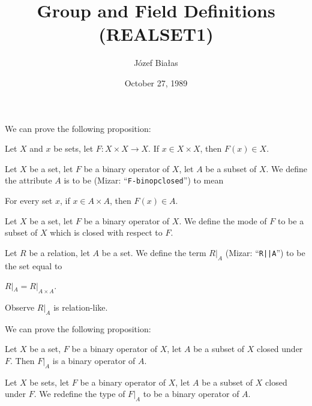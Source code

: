 \documentclass{article}
\title{Group and Field Definitions (REALSET1)}
\author{J\'ozef Bia{\l}as}
\date{October 27, 1989}
\begin{document}
\maketitle

We can prove the following proposition:
\begin{thm}
\item\label{realset1:1} Let $X$ and $x$ be sets, let $F\colon X\times X\to X$.
  If $x\in X\times X$, then $F(x)\in X$.
\end{thm}

\begin{definition}
Let $X$ be a set, let $F$ be a binary operator of $X$, let $A$ be a
subset of $X$.
We define the attribute $A$ is to be 
(Mizar: ``\verb#F-binopclosed#'') to mean
\begin{defn}
\item For every set $x$, if $x\in A\times A$, then $F(x)\in A$.
\end{defn}
\end{definition}

\begin{definition}
Let $X$ be a set, let $F$ be a binary operator of $X$.
We define the mode  of $F$ to be a subset of $X$ which
is closed with respect to $F$.
\end{definition}

\begin{definition}
Let $R$ be a relation, let $A$ be a set. We define the term $R|_{A}$
(Mizar: ``\verb#R||A#'') to be the set equal to
\begin{defn}
\item $R|_{A}=R|_{A\times A}$.
\end{defn}
\end{definition}

Observe $R|_{A}$ is relation-like.

We can prove the following proposition:
\begin{thm}
\item\label{realset1:2} Let $X$ be a set, $F$ be a binary operator
  of $X$, let $A$ be a subset of $X$ closed under $F$.
  Then $F|_{A}$ is a binary operator of $A$.
\end{thm}

\begin{definition}
Let $X$ be sets, let $F$ be a binary operator of $X$, let $A$ be a
subset of $X$ closed under $F$.
We redefine the type of $F|_{A}$ to be a binary operator of $A$.
\end{definition}
\end{document}
